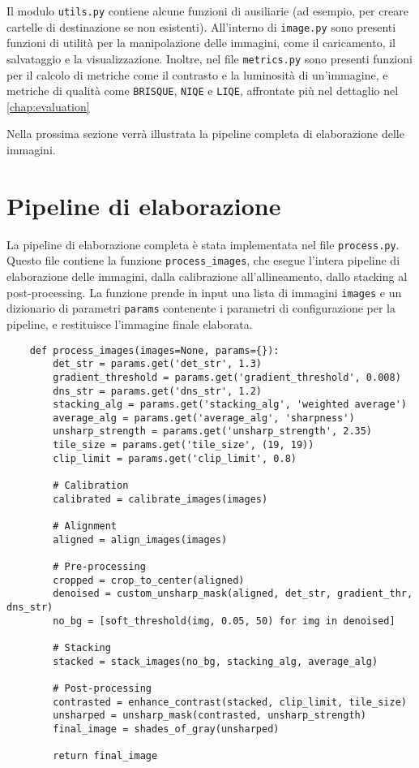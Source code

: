 Il modulo \texttt{utils.py} contiene alcune funzioni di ausiliarie (ad esempio, per creare cartelle di destinazione se non esistenti). All'interno di \texttt{image.py} sono presenti funzioni di utilità per la manipolazione delle immagini, come il caricamento, il salvataggio e la visualizzazione. Inoltre, nel file \texttt{metrics.py} sono presenti funzioni per il calcolo di metriche come il contrasto e la luminosità di un'immagine, e metriche di qualità come \texttt{BRISQUE}, \texttt{NIQE} e \texttt{LIQE}, affrontate più nel dettaglio nel \cref{chap:evaluation}

Nella prossima sezione verrà illustrata la pipeline completa di elaborazione delle immagini.

\section{Pipeline di elaborazione} \label{sec:pipeline_impl}

La pipeline di elaborazione completa è stata implementata nel file \texttt{process.py}. Questo file contiene la funzione \texttt{process\_images}, che esegue l'intera pipeline di elaborazione delle immagini, dalla calibrazione all'allineamento, dallo stacking al post-processing. La funzione prende in input una lista di immagini \texttt{images} e un dizionario di parametri \texttt{params} contenente i parametri di configurazione per la pipeline, e restituisce l'immagine finale elaborata.

\begin{lstlisting}
    def process_images(images=None, params={}):
        det_str = params.get('det_str', 1.3)
        gradient_threshold = params.get('gradient_threshold', 0.008)
        dns_str = params.get('dns_str', 1.2)
        stacking_alg = params.get('stacking_alg', 'weighted average')
        average_alg = params.get('average_alg', 'sharpness')
        unsharp_strength = params.get('unsharp_strength', 2.35)
        tile_size = params.get('tile_size', (19, 19))
        clip_limit = params.get('clip_limit', 0.8)

        # Calibration
        calibrated = calibrate_images(images)

        # Alignment
        aligned = align_images(images)

        # Pre-processing
        cropped = crop_to_center(aligned)
        denoised = custom_unsharp_mask(aligned, det_str, gradient_thr, dns_str)
        no_bg = [soft_threshold(img, 0.05, 50) for img in denoised]

        # Stacking
        stacked = stack_images(no_bg, stacking_alg, average_alg)

        # Post-processing
        contrasted = enhance_contrast(stacked, clip_limit, tile_size)
        unsharped = unsharp_mask(contrasted, unsharp_strength)
        final_image = shades_of_gray(unsharped)
        
        return final_image
\end{lstlisting}

